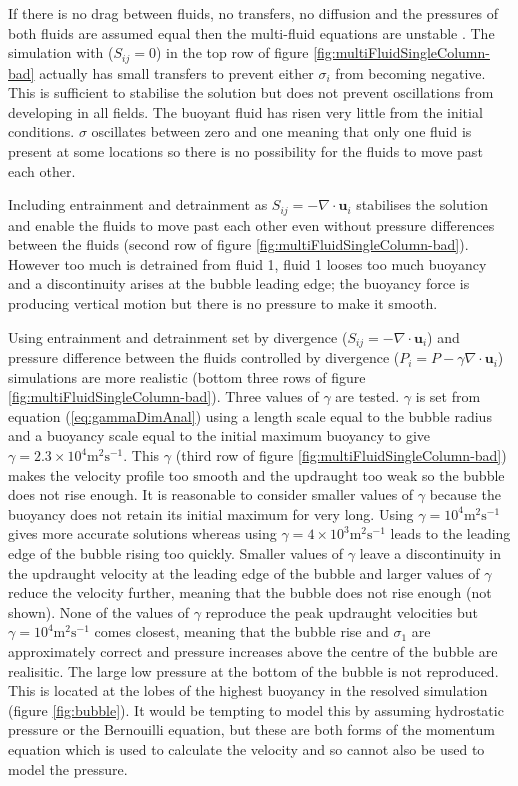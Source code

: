 \documentclass[draft]{agujournal2019}
\begin{document}
If there is no drag between fluids, no transfers, no diffusion and
the pressures of both fluids are assumed equal then the multi-fluid
equations are unstable \cite{TEB19}. The simulation with ($S_{ij}=0$)
in the top row of figure \ref{fig:multiFluidSingleColumn-bad} actually
has small transfers to prevent either $\sigma_{i}$ from becoming
negative. This is sufficient to stabilise the solution but does not
prevent oscillations from developing in all fields. The buoyant fluid
has risen very little from the initial conditions. $\sigma$ oscillates
between zero and one meaning that only one fluid is present at some
locations so there is no possibility for the fluids to move past each
other.

Including entrainment and detrainment as $S_{ij}=-\nabla\cdot\mathbf{u}_{i}$
stabilises the solution and enable the fluids to move past each other
even without pressure differences between the fluids (second row of
figure \ref{fig:multiFluidSingleColumn-bad}). However too much is
detrained from fluid 1, fluid 1 looses too much buoyancy and a discontinuity
arises at the bubble leading edge; the buoyancy force is producing
vertical motion but there is no pressure to make it smooth. 

Using entrainment and detrainment set by divergence ($S_{ij}=-\nabla\cdot\mathbf{u}_{i}$)
and pressure difference between the fluids controlled by divergence
($P_{i}=P-\gamma\nabla\cdot\mathbf{u}_{i}$) simulations are more
realistic (bottom three rows of figure \ref{fig:multiFluidSingleColumn-bad}).
Three values of $\gamma$ are tested. $\gamma$ is set from equation
(\ref{eq:gammaDimAnal}) using a length scale equal to the bubble
radius and a buoyancy scale equal to the initial maximum buoyancy
to give $\gamma=2.3\times10^{4}\text{m}^{2}\text{s}^{-1}$. This $\gamma$
(third row of figure \ref{fig:multiFluidSingleColumn-bad}) makes
the velocity profile too smooth and the updraught too weak so the
bubble does not rise enough. It is reasonable to consider smaller
values of $\gamma$ because the buoyancy does not retain its initial
maximum for very long. Using $\gamma=10^{4}\text{m}^{2}\text{s}^{-1}$
gives more accurate solutions whereas using $\gamma=4\times10^{3}\text{m}^{2}\text{s}^{-1}$
leads to the leading edge of the bubble rising too quickly. Smaller
values of $\gamma$ leave a discontinuity in the updraught velocity
at the leading edge of the bubble and larger values of $\gamma$ reduce
the velocity further, meaning that the bubble does not rise enough
(not shown). None of the values of $\gamma$ reproduce the peak updraught
velocities but $\gamma=10^{4}\text{m}^{2}\text{s}^{-1}$ comes closest,
meaning that the bubble rise and $\sigma_{1}$ are approximately correct
and pressure increases above the centre of the bubble are realisitic.
The large low pressure at the bottom of the bubble is not reproduced.
This is located at the lobes of the highest buoyancy in the resolved
simulation (figure \ref{fig:bubble}). It would be tempting to model
this by assuming hydrostatic pressure or the Bernouilli equation,
but these are both forms of the momentum equation which is used to
calculate the velocity and so cannot also be used to model the pressure. 
\end{document}
